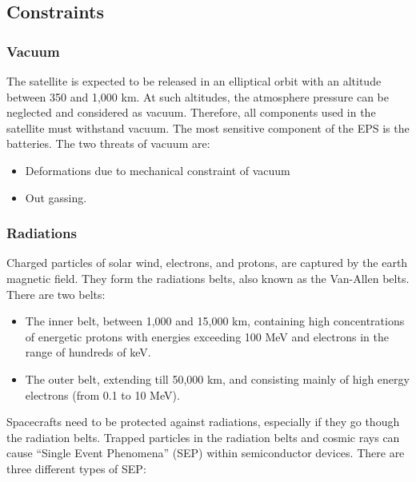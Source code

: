 \subsection{Constraints} 

\subsubsection*{Vacuum}

The satellite is expected to be released in an elliptical orbit with an altitude between 350 and 1,000 km. At such altitudes, the atmosphere pressure can be neglected and considered as vacuum. Therefore, all components used in the satellite must withstand vacuum. The most sensitive component of the EPS is the batteries. The two threats of vacuum are:
\begin{itemize}
\item Deformations due to mechanical constraint of vacuum
\item Out gassing.
\end{itemize}

\subsubsection*{Radiations}

Charged particles of solar wind, electrons, and protons, are captured by the earth magnetic field. They form the radiations belts, also known as the Van-Allen belts. There are two belts:
\begin{itemize}
\item The inner belt, between 1,000 and 15,000 km, containing high concentrations of energetic protons with energies exceeding 100 MeV and electrons in the range of hundreds of keV.
\item The outer belt, extending till 50,000 km, and consisting mainly of high energy electrons (from 0.1 to 10 MeV).
\end{itemize}

Spacecrafts need to be protected against radiations, especially if they go though the radiation belts. Trapped particles in the radiation belts and cosmic rays can cause “Single Event Phenomena” (SEP) within semiconductor devices. There are three different types of SEP:

